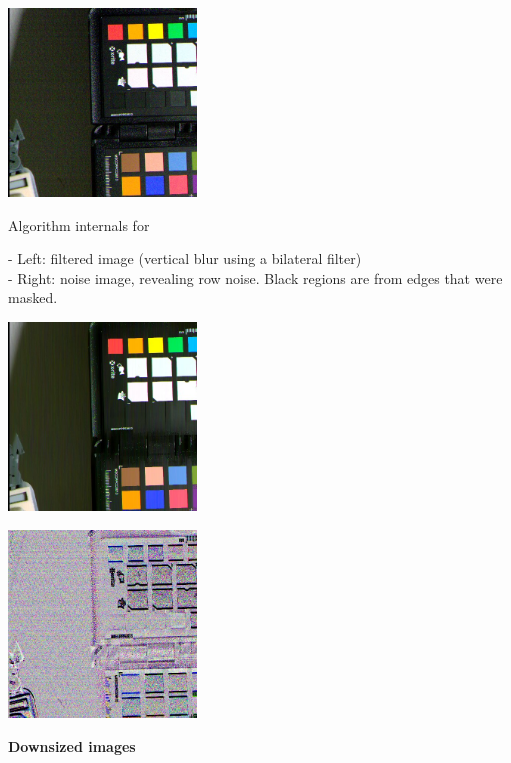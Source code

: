 \begin{center}
\includegraphics[height=5cm]{images/10ms+4-rnfilter2-crop}
\end{center}

Algorithm internals for 

- Left: filtered image (vertical blur using a bilateral filter)\\
- Right: noise image, revealing row noise. Black regions are from edges that were masked.\\ 

\begin{center}
\includegraphics[height=5cm]{images/10ms+4-fixrn-dbg-denoised-crop}
\end{center}

\begin{center}
\includegraphics[height=5cm]{images/10ms+4-fixrn-dbg-noise-crop}
\end{center}

\textbf{Downsized images}\\

